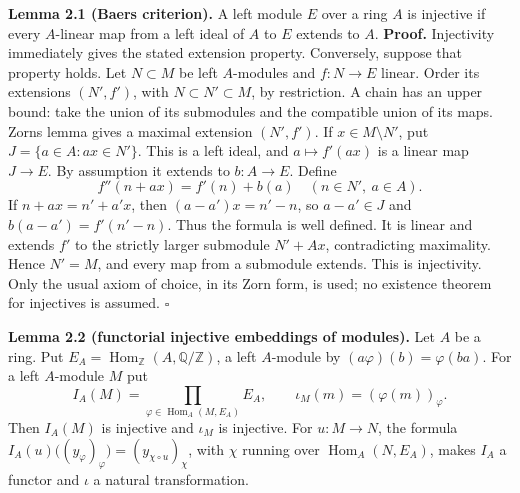 \documentclass[
  english,
  11pt,
  a4paper,
]{article}
\begin{document}
\textbf{Lemma 2.1 (Baer\textquotesingle s criterion).} A left module
\(E\) over a ring \(A\) is injective if every \(A\)-linear map from a
left ideal of \(A\) to \(E\) extends to \(A\). \textbf{Proof.}
Injectivity immediately gives the stated extension property. Conversely,
suppose that property holds. Let \(N\subset M\) be left \(A\)-modules
and \(f:N\to E\) linear. Order its extensions \((N',f')\), with
\(N\subset N'\subset M\), by restriction. A chain has an upper bound:
take the union of its submodules and the compatible union of its maps.
Zorn\textquotesingle s lemma gives a maximal extension \((N',f')\). If
\(x\in M\setminus N'\), put \(J=\{a\in A:ax\in N'\}\). This is a left
ideal, and \(a\mapsto f'(ax)\) is a linear map \(J\to E\). By assumption
it extends to \(b:A\to E\). Define
\[f''(n+ax)=f'(n)+b(a)\quad(n\in N',\ a\in A).\] If \(n+ax=n'+a'x\),
then \((a-a')x=n'-n\), so \(a-a'\in J\) and \(b(a-a')=f'(n'-n)\). Thus
the formula is well defined. It is linear and extends \(f'\) to the
strictly larger submodule \(N'+Ax\), contradicting maximality. Hence
\(N'=M\), and every map from a submodule extends. This is injectivity.
Only the usual axiom of choice, in its Zorn form, is used; no existence
theorem for injectives is assumed. \(\square\)

\textbf{Lemma 2.2 (functorial injective embeddings of modules).} Let
\(A\) be a ring. Put
\(E_A=\operatorname{Hom}_{\mathbb Z}(A,\mathbb Q/\mathbb Z)\), a left
\(A\)-module by \((a\varphi)(b)=\varphi(ba)\). For a left \(A\)-module
\(M\) put
\[I_A(M)=\prod_{\varphi\in\operatorname{Hom}_A(M,E_A)}E_A,\qquad \iota_M(m)=(\varphi(m))_\varphi .
\tag{2.1}\] Then \(I_A(M)\) is injective and \(\iota_M\) is injective.
For \(u:M\to N\), the formula
\(I_A(u)\bigl((y_\varphi)_\varphi\bigr)=(y_{\chi\circ u})_{\chi}\), with
\(\chi\) running over \(\operatorname{Hom}_A(N,E_A)\), makes \(I_A\) a
functor and \(\iota\) a natural transformation.
\end{document}
